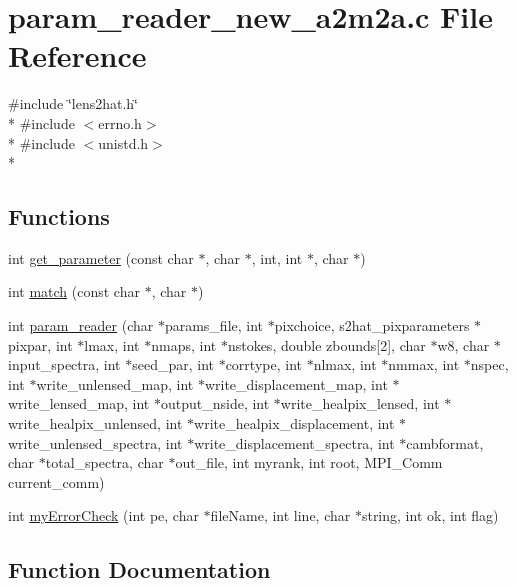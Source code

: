 \section{param\-\_\-reader\-\_\-new\-\_\-a2m2a.\-c File Reference}
\label{param__reader__new__a2m2a_8c}
{\ttfamily \#include \char`\"{}lens2hat.\-h\char`\"{}}\\*
{\ttfamily \#include $<$errno.\-h$>$}\\*
{\ttfamily \#include $<$unistd.\-h$>$}\\*
\subsection*{Functions}
\begin{DoxyCompactItemize}
\item 
int \hyperlink{param__reader__new__a2m2a_8c_aa58f4ecc3318546d08e4282c739db7a3}{get\-\_\-parameter} (const char $\ast$, char $\ast$, int, int $\ast$, char $\ast$)
\item 
int \hyperlink{param__reader__new__a2m2a_8c_af71971b64e93dd85136d531400035e57}{match} (const char $\ast$, char $\ast$)
\item 
int \hyperlink{param__reader__new__a2m2a_8c_a990ccd7e0b3352322502e77838c159d7}{param\-\_\-reader} (char $\ast$params\-\_\-file, int $\ast$pixchoice, s2hat\-\_\-pixparameters $\ast$pixpar, int $\ast$lmax, int $\ast$nmaps, int $\ast$nstokes, double zbounds\mbox{[}2\mbox{]}, char $\ast$w8, char $\ast$input\-\_\-spectra, int $\ast$seed\-\_\-par, int $\ast$corrtype, int $\ast$nlmax, int $\ast$nmmax, int $\ast$nspec, int $\ast$write\-\_\-unlensed\-\_\-map, int $\ast$write\-\_\-displacement\-\_\-map, int $\ast$write\-\_\-lensed\-\_\-map, int $\ast$output\-\_\-nside, int $\ast$write\-\_\-healpix\-\_\-lensed, int $\ast$write\-\_\-healpix\-\_\-unlensed, int $\ast$write\-\_\-healpix\-\_\-displacement, int $\ast$write\-\_\-unlensed\-\_\-spectra, int $\ast$write\-\_\-displacement\-\_\-spectra, int $\ast$cambformat, char $\ast$total\-\_\-spectra, char $\ast$out\-\_\-file, int myrank, int root, M\-P\-I\-\_\-\-Comm current\-\_\-comm)
\item 
int \hyperlink{param__reader__new__a2m2a_8c_a70bcbd531a6e4abc62d73f5b4532c2cc}{my\-Error\-Check} (int pe, char $\ast$file\-Name, int line, char $\ast$string, int ok, int flag)
\end{DoxyCompactItemize}


\subsection{Function Documentation}

